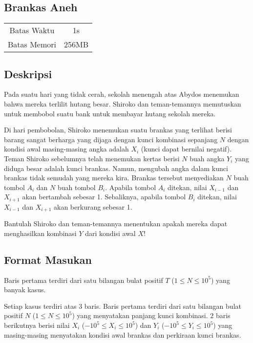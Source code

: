 \documentclass{article}
\begin{document}
\begin{center}

    
    \section*{Brankas Aneh} %

    \begin{tabular}{ | c c | }
        \hline
        Batas Waktu  & 1s \\    %
        Batas Memori & 256MB \\  %
        \hline
    \end{tabular}
\end{center}

\subsection*{Deskripsi}

Pada suatu hari yang tidak cerah, sekolah menengah atas Abydos menemukan bahwa mereka terlilit hutang besar. Shiroko dan teman-temannya memutuskan untuk membobol suatu bank untuk membayar hutang sekolah mereka.

Di hari pembobolan, Shiroko menemukan suatu brankas yang terlihat berisi barang sangat berharga yang dijaga dengan kunci kombinasi sepanjang $N$ dengan kondisi awal masing-masing angka adalah $X_i$ (kunci dapat bernilai negatif). Teman Shiroko sebelumnya telah menemukan kertas berisi $N$ buah angka $Y_i$ yang diduga besar adalah kunci brankas. Namun, mengubah angka dalam kunci brankas tidak semudah yang mereka kira. Brankas tersebut menyediakan $N$ buah tombol $A_i$ dan $N$ buah tombol $B_i$. Apabila tombol $A_i$ ditekan, nilai $X_{i-1}$ dan $X_{i+1}$ akan bertambah sebesar 1. Sebaliknya, apabila tombol $B_i$ ditekan, nilai $X_{i-1}$ dan $X_{i+1}$ akan berkurang sebesar 1.

Bantulah Shiroko dan teman-temannya menentukan apakah mereka dapat menghasilkan kombinasi $Y$ dari kondisi awal $X$!

\subsection*{Format Masukan}

Baris pertama terdiri dari satu bilangan bulat positif $T$ ($1 \leq N \leq 10^{5}$)  yang banyak kasus.

Setiap kasus terdiri atas 3 baris. Baris pertama terdiri dari satu bilangan bulat positif $N$ ($1 \leq N \leq 10^{5}$)  yang menyatakan panjang kunci kombinasi.
$2$ baris berikutnya berisi nilai $X_i$ ($-10^{5} \leq X_i \leq 10^{5}$) dan $Y_i$ ($-10^{5} \leq Y_i \leq 10^{5}$) yang masing-masing menyatakan kondisi awal brankas dan perkiraan kunci brankas.
\end{document}
